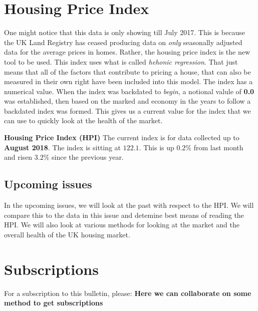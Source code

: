 \documentclass[letterpaper]{scrartcl}
\begin{document}
        \section*{\color{triton_green}Housing Price Index}
        One might notice that this data is only showing till July 2017. This is because the UK Land Registry has ceased producing data on \textit{only} seasonally adjusted data for the average prices in homes. Rather, the housing price index is the new tool to be used. This index uses what is called \textit{hehonic regression}. That just means that all of the factors that contribute to pricing a house, that can also be measured in their own right have been included into this model. The index has a numerical value. When the index was backdated to \textit{begin}, a notional valule of \textbf{0.0} was established, then based on the marked and economy in the years to follow a backdated index was formed. This gives us a current value for the index that we can use to quickly look at the health of the market. 
    \begin{mdframed}[style=MyFrame]
        \textbf{Housing Price Index (HPI)} 
        The current index is for data collected up to \textbf{August 2018}. The index is sitting at $122.1$. This is up  $0.2\%$ from last month and risen $3.2\%$ since the previous year. 
        \end{mdframed}
    \subsection*{\color{triton_green}Upcoming issues}
    In the upcoming issues, we will look at the past with respect to the HPI. We will compare this to the data in this issue and detemine best means of reading the HPI. We will also look at various methods for looking at the market and the overall health of the UK housing market.
    \section*{\color{triton_green}Subscriptions}
    For a subscription to this bulletin, please: \textbf{Here we can collaborate on some method to get subscriptions}
    
    
    

        

    
	
\end{document}
